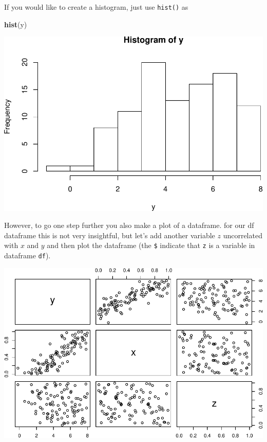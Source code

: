 \documentclass[]{article}
\newenvironment{Shaded}{\begin{snugshade}}{\end{snugshade}}
\newcommand{\KeywordTok}[1]{\textcolor[rgb]{0.13,0.29,0.53}{\textbf{{#1}}}}
\newcommand{\DecValTok}[1]{\textcolor[rgb]{0.00,0.00,0.81}{{#1}}}
\newcommand{\StringTok}[1]{\textcolor[rgb]{0.31,0.60,0.02}{{#1}}}
\newcommand{\NormalTok}[1]{{#1}}
\begin{document}
If you would like to create a histogram, just use \texttt{hist()} as

\begin{Shaded}
\begin{Highlighting}[]
\KeywordTok{hist}\NormalTok{(y)}
\end{Highlighting}
\end{Shaded}

\includegraphics{./unnamed-chunk-25-1.pdf}

However, to go one step further you also make a plot of a dataframe. for
our df dataframe this is not very insightful, but let's add another
variable \(z\) uncorrelated with \(x\) and \(y\) and then plot the
dataframe (the \texttt{\$} indicate that \texttt{z} is a variable in
dataframe \texttt{df}).

\begin{Shaded}
\end{Shaded}

\includegraphics{./unnamed-chunk-26-1.pdf}
\end{document}
